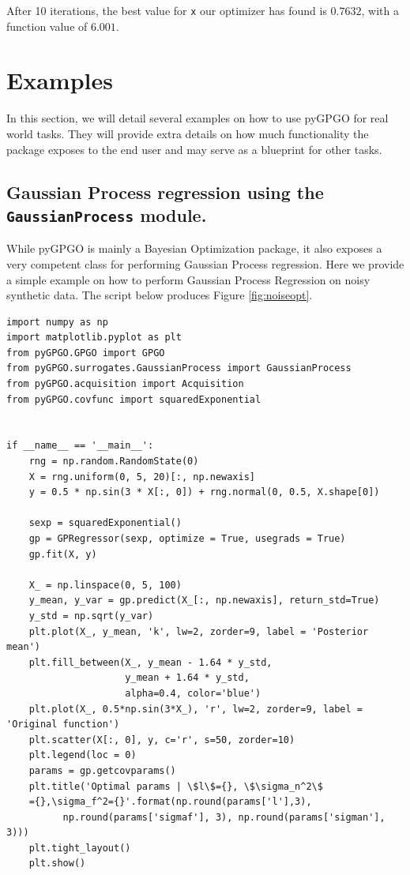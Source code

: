 \documentclass[10pt,a4paper,twoside]{book}
\begin{document}
After 10 iterations, the best value for \texttt{x} our optimizer has found is $0.7632$, with a function value of $6.001$.

\section{Examples}

In this section, we will detail several examples on how to use pyGPGO for real world tasks. They will provide extra details on how much functionality the package exposes to the end user and may serve as a blueprint for other tasks.


\subsection{Gaussian Process regression using the \texttt{GaussianProcess} module.}

While pyGPGO is mainly a Bayesian Optimization package, it also exposes a very competent class for performing Gaussian Process regression. Here we provide a simple example on how to perform Gaussian Process Regression on noisy synthetic data. The script below produces Figure \ref{fig:noiseopt}.

\begin{verbatim}
import numpy as np
import matplotlib.pyplot as plt
from pyGPGO.GPGO import GPGO
from pyGPGO.surrogates.GaussianProcess import GaussianProcess
from pyGPGO.acquisition import Acquisition
from pyGPGO.covfunc import squaredExponential


if __name__ == '__main__':
    rng = np.random.RandomState(0)
    X = rng.uniform(0, 5, 20)[:, np.newaxis]
    y = 0.5 * np.sin(3 * X[:, 0]) + rng.normal(0, 0.5, X.shape[0])

    sexp = squaredExponential()
    gp = GPRegressor(sexp, optimize = True, usegrads = True)
    gp.fit(X, y)

    X_ = np.linspace(0, 5, 100)
    y_mean, y_var = gp.predict(X_[:, np.newaxis], return_std=True)
    y_std = np.sqrt(y_var)
    plt.plot(X_, y_mean, 'k', lw=2, zorder=9, label = 'Posterior mean')
    plt.fill_between(X_, y_mean - 1.64 * y_std,
                     y_mean + 1.64 * y_std,
                     alpha=0.4, color='blue')
    plt.plot(X_, 0.5*np.sin(3*X_), 'r', lw=2, zorder=9, label = 'Original function')
    plt.scatter(X[:, 0], y, c='r', s=50, zorder=10)
    plt.legend(loc = 0)
    params = gp.getcovparams()
    plt.title('Optimal params | \$l\$={}, \$\sigma_n^2\$
    ={},\sigma_f^2={}'.format(np.round(params['l'],3),
    	  np.round(params['sigmaf'], 3), np.round(params['sigman'], 3)))
    plt.tight_layout()
    plt.show()
\end{verbatim}
\end{document}
